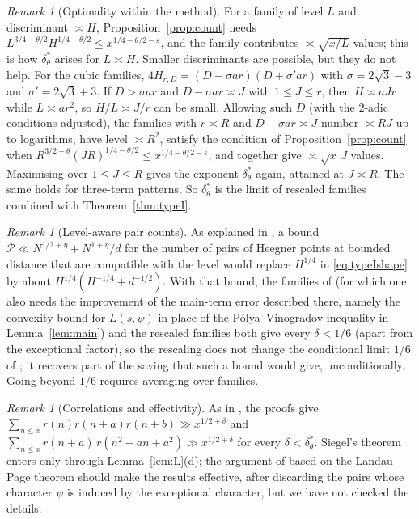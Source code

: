\documentclass[11pt]{amsart}
\theoremstyle{remark}
\newtheorem{remark}[theorem]{Remark}
\theoremstyle{definition}
\numberwithin{equation}{section}
\newcommand{\eps}{\varepsilon}
\newcommand{\Pc}{\mathcal{P}}
\begin{document}
\begin{remark}[Optimality within the method]\label{rem:optimal}
For a family of level $L$ and discriminant $\asymp H$, Proposition~\ref{prop:count} needs $L^{3/4-\theta/2}H^{1/4-\theta/2}\le x^{1/4-\theta/2-\eps}$, and the family contributes $\asymp\sqrt{x/L}$ values; this is how $\delta^*_\theta$ arises for $L\asymp H$. Smaller discriminants are possible, but they do not help. For the cubic families, $4H_{r,D}=(D-\sigma ar)(D+\sigma'ar)$ with $\sigma=2\sqrt3-3$ and $\sigma'=2\sqrt3+3$. If $D>\sigma ar$ and $D-\sigma ar\asymp J$ with $1\le J\le r$, then $H\asymp aJr$ while $L\asymp ar^2$, so $H/L\asymp J/r$ can be small. Allowing such $D$ (with the $2$-adic conditions adjusted), the families with $r\asymp R$ and $D-\sigma ar\asymp J$ number $\asymp RJ$ up to logarithms, have level $\asymp R^2$, satisfy the condition of Proposition~\ref{prop:count} when $R^{3/2-\theta}(JR)^{1/4-\theta/2}\le x^{1/4-\theta/2-\eps}$, and together give $\asymp\sqrt x\,J$ values. Maximising over $1\le J\le R$ gives the exponent $\delta^*_\theta$ again, attained at $J\asymp R$. The same holds for three-term patterns. So $\delta^*_\theta$ is the limit of rescaled families combined with Theorem~\ref{thm:typeI}.
\end{remark}

\begin{remark}[Level-aware pair counts]\label{rem:levelaware}
As explained in \cite[Remark~13.1]{IC}, a bound $\Pc\ll N^{1/2+\eta}+N^{1+\eta}/d$ for the number of pairs of Heegner points at bounded distance that are compatible with the level would replace $H^{1/4}$ in \eqref{eq:typeIshape} by about $H^{1/4}(H^{-1/4}+d^{-1/2})$. With that bound, the families of \cite{IC} (for which one also needs the improvement of the main-term error described there, namely the convexity bound for $L(s,\psi)$ in place of the P\'olya--Vinogradov inequality in Lemma~\ref{lem:main}) and the rescaled families both give every $\delta<1/6$ (apart from the exceptional factor), so the rescaling does not change the conditional limit $1/6$ of \cite[Remark~13.1]{IC}; it recovers part of the saving that such a bound would give, unconditionally. Going beyond $1/6$ requires averaging over families.
\end{remark}

\begin{remark}[Correlations and effectivity]\label{rem:corr}
As in \cite[Remark~13.7]{IC}, the proofs give $\sum_{n\le x}r(n)r(n+a)r(n+b)\gg x^{1/2+\delta}$ and $\sum_{n\le x}r(n+a)\,r(n^2-an+a^2)\gg x^{1/2+\delta}$ for every $\delta<\delta^*_\theta$. Siegel's theorem enters only through Lemma~\ref{lem:L}(d); the argument of \cite[Remark~13.6]{IC} based on the Landau--Page theorem should make the results effective, after discarding the pairs whose character $\psi$ is induced by the exceptional character, but we have not checked the details.
\end{remark}
\end{document}

